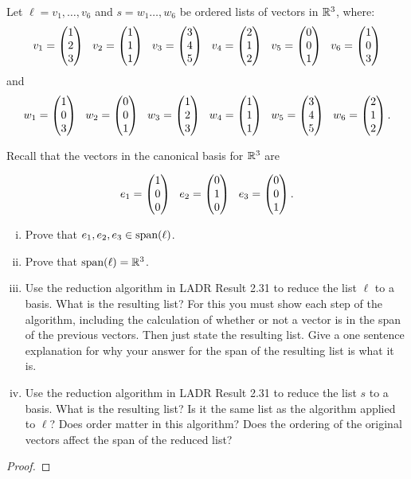 
\begin{question}\label{que:ReductionAlgorithm}
	\normalfont
	
	
	Let $\ell=v_1,\dots, v_6$ and $s=w_1\dots,w_6$ be ordered lists of vectors in ${\mathbb R}^3$, where:
	\begin{align*}
		v_1 = \ColVecThree{1}{2}{3}\ \ 
		v_2 = \ColVecThree{1}{1}{1}\ \
		v_3 = \ColVecThree{3}{4}{5}\ \ 
		v_4 = \ColVecThree{2}{1}{2}\ \ 
		v_5 = \ColVecThree{0}{0}{1}\ \ 
		v_6 = \ColVecThree{1}{0}{3}
	\end{align*}
	and
	\begin{align*}
		w_1 = \ColVecThree{1}{0}{3}\ \ 
		w_2 = \ColVecThree{0}{0}{1}\ \
		w_3 = \ColVecThree{1}{2}{3}\ \ 
		w_4 = \ColVecThree{1}{1}{1}\ \ 
		w_5 = \ColVecThree{3}{4}{5}\ \ 
		w_6 = \ColVecThree{2}{1}{2}.
	\end{align*}
	
	\vspace{.2cm}
	
	Recall that the vectors in the canonical basis for ${\mathbb R}^3$ are
	
	\begin{align*}
		e_1 = \begin{pmatrix} 1\\ 0\\ 0\end{pmatrix}\ \
		e_2 = \begin{pmatrix} 0\\ 1\\ 0\end{pmatrix}\ \
		e_3 = \begin{pmatrix} 0\\ 0\\ 1\end{pmatrix}. 
	\end{align*}
	
	\vspace{.2cm}
	\begin{enumerate}[(i)]
		\item Prove that $e_1,e_2,e_3\in\textnormal{span}(\ell)$.
		\item Prove that $\textnormal{span}(\ell)={\mathbb R}^3$.
		\item Use the reduction algorithm in LADR Result 2.31 to reduce the list $\ell$ to a basis.  What is the resulting list?    For this you must show each step of the algorithm, including the calculation of whether or not a vector is in the span of the previous vectors.  Then just state the resulting list.  Give a one sentence explanation for why your answer for the span of the resulting list is what it is.
		\item Use the reduction algorithm in LADR Result 2.31 to reduce the list $s$ to a basis.  What is the resulting list?  Is it the same list as the algorithm applied to $\ell$?  Does order matter in this algorithm?  Does the ordering of the original vectors affect the span of the reduced list?
	\end{enumerate}
\end{question}
\renewcommand{\qedsymbol}{}
\begin{proof}
    
\end{proof}